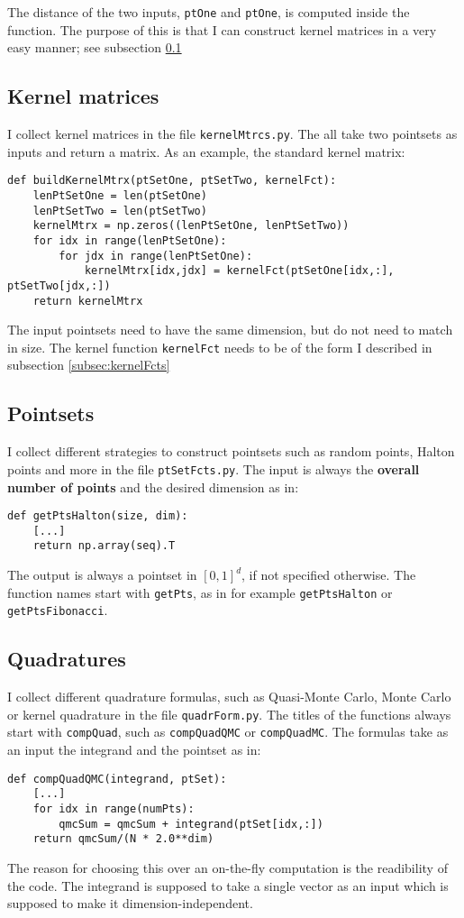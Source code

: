 \documentclass[11pt]{article}
\begin{document}
The distance of the two inputs, \texttt{ptOne} and \texttt{ptOne}, is computed inside the function. The purpose of this is that I can construct kernel matrices in a very easy manner; see subsection \ref{subsec:kernelMtrcs}

\subsection{Kernel matrices}
\label{subsec:kernelMtrcs}
I collect kernel matrices in the file \texttt{kernelMtrcs.py}. The all take two pointsets as inputs and return a matrix. As an example, the standard kernel matrix: 
\begin{Verbatim}[formatcom=\color{blue!50!black}]
def buildKernelMtrx(ptSetOne, ptSetTwo, kernelFct):
    lenPtSetOne = len(ptSetOne)
    lenPtSetTwo = len(ptSetTwo)
    kernelMtrx = np.zeros((lenPtSetOne, lenPtSetTwo))
    for idx in range(lenPtSetOne):
        for jdx in range(lenPtSetOne):
            kernelMtrx[idx,jdx] = kernelFct(ptSetOne[idx,:], ptSetTwo[jdx,:])
    return kernelMtrx
\end{Verbatim}

The input pointsets need to have the same dimension, but do not need to match in size. The kernel function \texttt{kernelFct} needs to be of the form I described in subsection \ref{subsec:kernelFcts}


\subsection{Pointsets}
I collect different strategies to construct pointsets such as random points, Halton points and more in the file \texttt{ptSetFcts.py}. The input is always the \textbf{overall number of points} and the desired dimension as in:
\begin{Verbatim}[formatcom=\color{blue!50!black}]
def getPtsHalton(size, dim):
	[...]
	return np.array(seq).T
\end{Verbatim}
The output is always a pointset in $[0,1]^d$, if not specified otherwise. The function names start with \texttt{getPts}, as in for example \texttt{getPtsHalton} or \texttt{getPtsFibonacci}.


\subsection{Quadratures}
I collect different quadrature formulas, such as Quasi-Monte Carlo, Monte Carlo or kernel quadrature in the file \texttt{quadrForm.py}. The titles of the functions always start with \texttt{compQuad}, such as \texttt{compQuadQMC} or \texttt{compQuadMC}. The formulas take as an input the integrand and the pointset as in:
\begin{Verbatim}[formatcom=\color{blue!50!black}]
def compQuadQMC(integrand, ptSet):
	[...]
	for idx in range(numPts):
		qmcSum = qmcSum + integrand(ptSet[idx,:])
	return qmcSum/(N * 2.0**dim)
\end{Verbatim}
The reason for choosing this over an on-the-fly computation is the readibility of the code. The integrand is supposed to take a single vector as an input which is supposed to make it dimension-independent. \\
\end{document}
